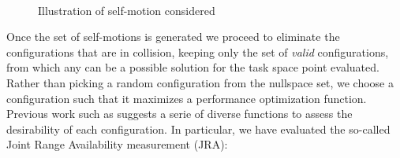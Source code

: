 \documentclass[conference]{IEEEtran}
\begin{document}
\begin{figure}[]
  \centering
   \\
  \caption{ Illustration of self-motion considered}
  \label{fig:SelfMotion_Illustration}
\end{figure}

Once the set of self-motions is generated we proceed to eliminate the configurations that are in collision, keeping only
the set of \textit{valid} configurations, from which any can be a possible solution for the task space point evaluated.
Rather than picking a random configuration from the nullspace set, we choose a configuration such that it maximizes a
performance optimization function. Previous work such as \cite{kapoor-ns-1998} suggests a serie of diverse functions to assess
the desirability of each configuration. In particular, we have evaluated the so-called Joint Range Availability measurement (JRA):
\end{document}

